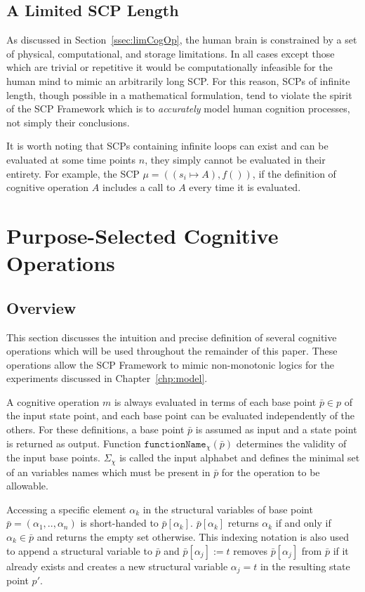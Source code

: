 \subsection{A Limited SCP Length}
As discussed in Section~\ref{ssec:limCogOp}, the human brain is constrained by a set of physical, computational, and storage limitations. In all cases except those which are trivial or repetitive it would be computationally infeasible for the human mind to mimic an arbitrarily long SCP. For this reason, SCPs of infinite length, though possible in a mathematical formulation, tend to violate the spirit of the SCP Framework which is to \textit{accurately} model human cognition processes, not simply their conclusions.

It is worth noting that SCPs containing infinite loops can exist and can be evaluated at some time points $n$, they simply cannot be evaluated in their entirety. For example, the SCP $\mu=((s_i\longmapsto A),f())$, if the definition of cognitive operation $A$ includes a call to $A$ every time it is evaluated. 

\section{Purpose-Selected Cognitive Operations} \label{sec:pso}
\subsection{Overview}

This section discusses the intuition and precise definition of several cognitive operations which will be used throughout the remainder of this paper. These operations allow the SCP Framework to mimic non-monotonic logics for the experiments discussed in Chapter~\ref{chp:model}.

A cognitive operation $m$ is always evaluated in terms of each base point $\bar{p} \in p$ of the input state point, and each base point can be evaluated independently of the others. For these definitions, a base point $\bar{p}$ is assumed as input and a state point is returned as output. Function $\texttt{functionName}_\chi(\bar{p})$ determines the validity of the input base points. $\Sigma_\chi$ is called the input alphabet and defines the minimal set of an variables names which must be present in $\bar{p}$ for the operation to be allowable.

Accessing a specific element $\alpha_k$ in the structural variables of base point $\bar{p}=(\alpha_1,..,\alpha_n)$ is short-handed to $\bar{p}[\alpha_k]$. $\bar{p}[\alpha_k]$ returns $\alpha_k$ if and only if $\alpha_k \in \bar{p}$ and returns the empty set otherwise. This indexing notation is also used to append a structural variable to $\bar{p}$ and $\bar{p}[\alpha_j]:=t$ removes $\bar{p}[\alpha_j]$ from $\bar{p}$ if it already exists and creates a new structural variable $\alpha_j=t$ in the resulting state point $p'$.

